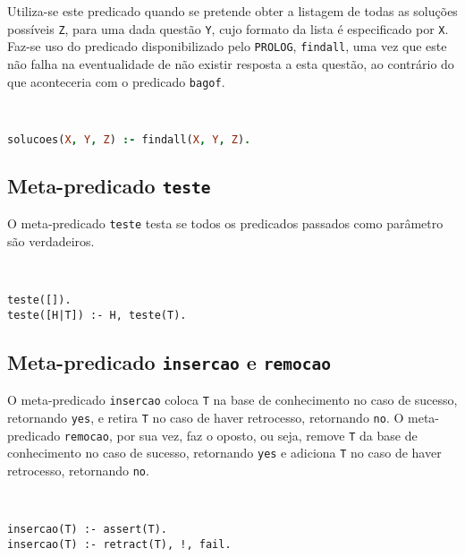 Utiliza-se este predicado quando se pretende obter a listagem de todas as soluções possíveis 
\texttt{Z}, para uma dada questão
\texttt{Y}, cujo formato da lista é especificado por \texttt{X}. Faz-se uso do predicado 
disponibilizado pelo \texttt{PROLOG},
\texttt{findall}, uma vez que este não falha na eventualidade de não existir resposta a esta 
questão, ao contrário do
que aconteceria com o predicado \texttt{bagof}.

\

\begin{lstlisting}[language=Prolog, caption={Extensão do meta-predicado \texttt{solucoes}}]
% Extensao do meta-predicado solucoes: X, Y, Z -> {V, F}
solucoes(X, Y, Z) :- findall(X, Y, Z).
\end{lstlisting}

\subsection*{Meta-predicado \texttt{teste}}

O meta-predicado \texttt{teste} testa se todos os predicados passados como parâmetro
são verdadeiros.

\

\begin{lstlisting}[caption={Extensão do meta-predicado \texttt{teste}}]
% Extensao do meta-predicado teste: L -> {V, F}
teste([]).
teste([H|T]) :- H, teste(T).
\end{lstlisting}

\subsection*{Meta-predicado \texttt{insercao} e \texttt{remocao}}

O meta-predicado \texttt{insercao} coloca \texttt{T} na base de conhecimento no caso de
sucesso, retornando \texttt{yes}, e retira \texttt{T} no caso de haver retrocesso, retornando 
\texttt{no}. O meta-
predicado \texttt{remocao}, por sua vez, faz o oposto, ou seja, remove \texttt{T} da
base de conhecimento no caso de sucesso, retornando \texttt{yes} e adiciona \texttt{T} no caso de 
haver retrocesso,
retornando \texttt{no}.

\

\begin{lstlisting}[caption={Extensão do meta-predicado \texttt{insercao}}]
% Extensao do meta-predicado insercao: T -> {V, F}
insercao(T) :- assert(T).
insercao(T) :- retract(T), !, fail.
\end{lstlisting}

